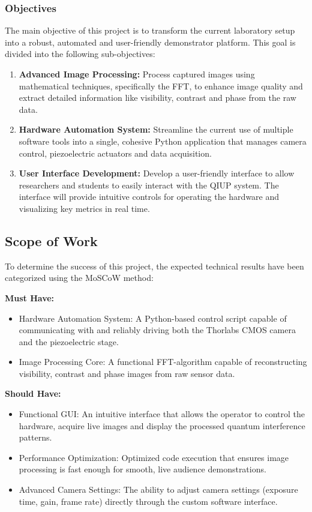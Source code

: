 \documentclass[12pt,a4paper]{article}
\begin{document}
    \subsubsection{Objectives}
    The main objective of this project is to transform the current laboratory setup into a robust, automated and user-friendly demonstrator platform. This goal is divided into the following sub-objectives:
        \begin{enumerate}
            \item \textbf{Advanced Image Processing:} Process captured images using mathematical techniques, specifically the \ac{FFT}, to enhance image quality and extract detailed information like visibility, contrast and phase from the raw data.
            \item \textbf{Hardware Automation System:} Streamline the current use of multiple software tools into a single, cohesive Python application that manages camera control, piezoelectric actuators and data acquisition.
            \item \textbf{User Interface Development:} Develop a user-friendly interface to allow researchers and students to easily interact with the \ac{QIUP} system. The interface will provide intuitive controls for operating the hardware and visualizing key metrics in real time.
        \end{enumerate}

\subsection{Scope of Work}
    To determine the success of this project, the expected technical results have been categorized using the MoSCoW method:

    \textbf{Must Have:}
    \begin{itemize}
        \item Hardware Automation System: A Python-based control script capable of communicating with and reliably driving both the Thorlabs \ac{CMOS} camera and the piezoelectric stage.
        \item Image Processing Core: A functional \ac{FFT}-algorithm capable of reconstructing visibility, contrast and phase images from raw sensor data.
    \end{itemize}

    \textbf{Should Have:}
    \begin{itemize}
        \item Functional \ac{GUI}: An intuitive interface that allows the operator to control the hardware, acquire live images and display the processed quantum interference patterns.
        \item Performance Optimization: Optimized code execution that ensures image processing is fast enough for smooth, live audience demonstrations.
        \item Advanced Camera Settings: The ability to adjust camera settings (exposure time, gain, frame rate) directly through the custom software interface.
    \end{itemize}
\end{document}
